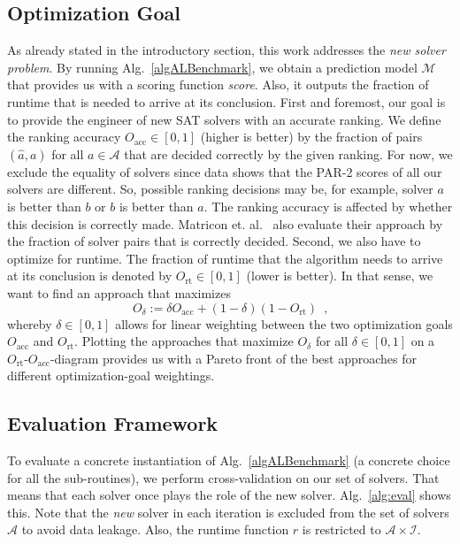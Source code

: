 \documentclass[runningheads]{llncs}
\begin{document}
\subsection{Optimization Goal}
\label{sec:goal}
As already stated in the introductory section, this work addresses the \textit{new solver problem}.
By running Alg.~\ref{algALBenchmark}, we obtain a prediction model $\mathcal{M}$ that provides us with a scoring function \textit{score}.
Also, it outputs the fraction of runtime that is needed to arrive at its conclusion.
First and foremost, our goal is to provide the engineer of new SAT solvers with an accurate ranking.
We define the ranking accuracy $O_{\operatorname{acc}} \in \left[0, 1\right]$ (higher is better) by the fraction of pairs $\left(\hat{a}, a\right)$ for all $a \in \mathcal{A}$ that are decided correctly by the given ranking.
For now, we exclude the equality of solvers since data shows that the PAR-2 scores of all our solvers are different.
So, possible ranking decisions may be, for example, solver $a$ is better than $b$ or $b$ is better than $a$.
The ranking accuracy is affected by whether this decision is correctly made.
Matricon et. al.~\cite{MatriconAFSH21} also evaluate their approach by the fraction of solver pairs that is correctly decided.
Second, we also have to optimize for runtime.
The fraction of runtime that the algorithm needs to arrive at its conclusion is denoted by $O_{\operatorname{rt}} \in \left[0, 1\right]$ (lower is better).
In that sense, we want to find an approach that maximizes
\begin{equation}
  O_\delta := \delta O_{\operatorname{acc}} + \left(1 - \delta\right) \left(1 - O_{\operatorname{rt}}\right) \enspace \textrm{,}
  \label{eq:opt}
\end{equation} 
whereby $\delta \in \left[0, 1\right]$ allows for linear weighting between the two optimization goals $O_{\operatorname{acc}}$ and $O_{\operatorname{rt}}$.
Plotting the approaches that maximize $O_\delta$ for all $\delta \in \left[0, 1\right]$ on a $O_{\operatorname{rt}}$-$O_{\operatorname{acc}}$-diagram provides us with a Pareto front of the best approaches for different optimization-goal weightings.

\subsection{Evaluation Framework}
\label{sec:evalframe}
To evaluate a concrete instantiation of Alg.~\ref{algALBenchmark} (a concrete choice for all the sub-routines), we perform cross-validation on our set of solvers.
That means that each solver once plays the role of the new solver.
Alg.~\ref{alg:eval} shows this.
Note that the \textit{new} solver in each iteration is excluded from the set of solvers $\mathcal{A}$ to avoid data leakage.
Also, the runtime function $r$ is restricted to $\mathcal{A} \times \mathcal{I}$.
\end{document}
